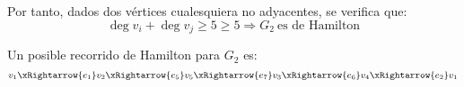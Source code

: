 \begin{ejercicio}
\begin{enumerate}
\begin{itemize}
            Por tanto, dados dos vértices cualesquiera no adyacentes, se verifica que:
            \begin{equation*}
                \deg v_i + \deg v_j \geq 5\geq 5\Longrightarrow G_2\ \text{es de Hamilton}
            \end{equation*}

            Un posible recorrido de Hamilton para $G_2$ es:
            \begin{equation*}
                v_1\xRightarrow{e_1}v_2\xRightarrow{e_5}v_5\xRightarrow{e_7}v_3\xRightarrow{e_6}v_4\xRightarrow{e_2}v_1
            \end{equation*}
        \end{itemize}
    \end{enumerate}
\end{ejercicio}


